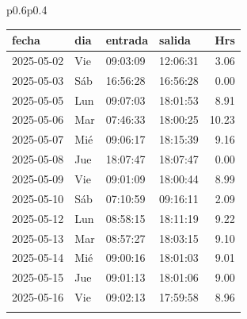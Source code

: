 \documentclass[11pt,a4paper]{article}
\newcommand{\mejoradatabla}[1]{
  \renewcommand{\arraystretch}{1.3}
  \setlength{\tabcolsep}{10pt}
#1
  \renewcommand{\arraystretch}{1}
  \setlength{\tabcolsep}{6pt}
}
\begin{document}
\begin{tabular}{p{}p{}}
\mejoradatabla{
\begin{tabular}{p{2cm} p{0.6cm} p{1.2cm} p{1.2cm} r}
\toprule
\rowcolor{grisclaro} \textbf{fecha} & \textbf{dia} & \textbf{entrada} & \textbf{salida} & \textbf{Hrs}\\
\midrule

\rowcolor{white}%
2025-05-02 & Vie & 09:03:09 & 12:06:31 &3.06\\
\rowcolor{jornadacero!20}%
\rowcolor{corporativo!20}
 2025-05-03  &  Sáb  &  16:56:28  &  16:56:28  &%
         \textcolor{jornadacero}{ 0.00 }\\
\rowcolor{white}%
2025-05-05 & Lun & 09:07:03 & 18:01:53 &8.91\\
\rowcolor{white}%
2025-05-06 & Mar & 07:46:33 & 18:00:25 &10.23\\
\rowcolor{white}%
2025-05-07 & Mié & 09:06:17 & 18:15:39 &9.16\\
\rowcolor{jornadacero!20}%
2025-05-08 & Jue & 18:07:47 & 18:07:47 &\textcolor{jornadacero}{ 0.00 }\\
\rowcolor{white}%
2025-05-09 & Vie & 09:01:09 & 18:00:44 &8.99\\
\rowcolor{white}%
\rowcolor{corporativo!20}
 2025-05-10  &  Sáb  &  07:10:59  &  09:16:11  &%
         2.09\\
\rowcolor{white}%
2025-05-12 & Lun & 08:58:15 & 18:11:19 &9.22\\
\rowcolor{white}%
2025-05-13 & Mar & 08:57:27 & 18:03:15 &9.10\\
\rowcolor{white}%
2025-05-14 & Mié & 09:00:16 & 18:01:03 &9.01\\
\rowcolor{white}%
2025-05-15 & Jue & 09:01:13 & 18:01:06 &9.00\\
\rowcolor{white}%
2025-05-16 & Vie & 09:02:13 & 17:59:58 &8.96\\
\rowcolor{white}%

\end{tabular}}
\end{tabular}
\end{document}
